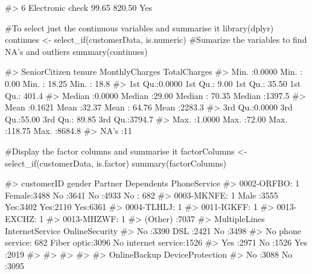 \begin{Schunk}
\begin{Soutput}
#> 6          Electronic check          99.65       820.50   Yes
\end{Soutput}
\begin{Sinput}
#To select just the continuous variables and summarise it
library(dplyr)
continues <- select_if(customerData, is.numeric)
#Sumarize the variables to find NA's and outliers
summary(continues)
\end{Sinput}
\begin{Soutput}
#>  SeniorCitizen        tenure      MonthlyCharges    TotalCharges   
#>  Min.   :0.0000   Min.   : 0.00   Min.   : 18.25   Min.   :  18.8  
#>  1st Qu.:0.0000   1st Qu.: 9.00   1st Qu.: 35.50   1st Qu.: 401.4  
#>  Median :0.0000   Median :29.00   Median : 70.35   Median :1397.5  
#>  Mean   :0.1621   Mean   :32.37   Mean   : 64.76   Mean   :2283.3  
#>  3rd Qu.:0.0000   3rd Qu.:55.00   3rd Qu.: 89.85   3rd Qu.:3794.7  
#>  Max.   :1.0000   Max.   :72.00   Max.   :118.75   Max.   :8684.8  
#>                                                    NA's   :11
\end{Soutput}
\begin{Sinput}
#Display the factor columns and summarise it
factorColumns <- select_if(customerData, is.factor)
summary(factorColumns)
\end{Sinput}
\begin{Soutput}
#>       customerID      gender     Partner    Dependents PhoneService
#>  0002-ORFBO:   1   Female:3488   No :3641   No :4933   No : 682    
#>  0003-MKNFE:   1   Male  :3555   Yes:3402   Yes:2110   Yes:6361    
#>  0004-TLHLJ:   1                                                   
#>  0011-IGKFF:   1                                                   
#>  0013-EXCHZ:   1                                                   
#>  0013-MHZWF:   1                                                   
#>  (Other)   :7037                                                   
#>           MultipleLines     InternetService             OnlineSecurity
#>  No              :3390   DSL        :2421   No                 :3498  
#>  No phone service: 682   Fiber optic:3096   No internet service:1526  
#>  Yes             :2971   No         :1526   Yes                :2019  
#>                                                                       
#>                                                                       
#>                                                                       
#>                                                                       
#>               OnlineBackup             DeviceProtection
#>  No                 :3088   No                 :3095   

\end{Soutput}
\end{Schunk}
